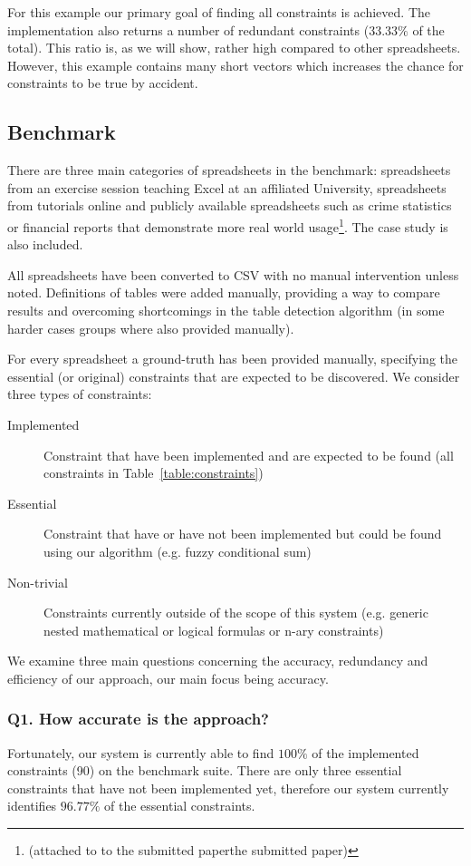 \documentclass{sig-alternate-05-2015}
\begin{document}
For this example our primary goal of finding all constraints is achieved.
The implementation also returns a number of redundant constraints ($33.33\%$ of the total).
This ratio is, as we will show, rather high compared to other spreadsheets.
However, this example contains many short vectors which increases the chance for constraints to be true by accident.

\subsection{Benchmark}
There are three main categories of spreadsheets in the benchmark: spreadsheets from an exercise session teaching Excel at an affiliated University, spreadsheets from tutorials online and publicly available spreadsheets such as crime statistics or financial reports that demonstrate more real world usage\footnote{(attached to to the submitted paperthe submitted paper)}.
The case study is also included.

All spreadsheets have been converted to CSV with no manual intervention unless noted.
Definitions of tables were added manually, providing a way to compare results and overcoming shortcomings in the table detection algorithm (in some harder cases groups where also provided manually).

For every spreadsheet a ground-truth has been provided manually, specifying the essential (or original) constraints that are expected to be discovered.
We consider three types of constraints:
\begin{description}
  \item[Implemented] Constraint that have been implemented and are expected to be found (all constraints in Table~\ref{table:constraints})
  \item[Essential] Constraint that have or have not been implemented but could be found using our algorithm (e.g. fuzzy conditional sum)
  \item[Non-trivial] Constraints currently outside of the scope of this system (e.g. generic nested mathematical or logical formulas or n-ary constraints)
\end{description}

We examine three main questions concerning the accuracy, redundancy and efficiency of our approach, our main focus being accuracy.

\subsubsection*{Q1. How accurate is the approach?}
Fortunately, our system is currently able to find $100\%$ of the implemented constraints (90) on the benchmark suite.
There are only three essential constraints that have not been implemented yet, therefore our system currently identifies $96.77\%$ of the essential constraints.
\end{document}
